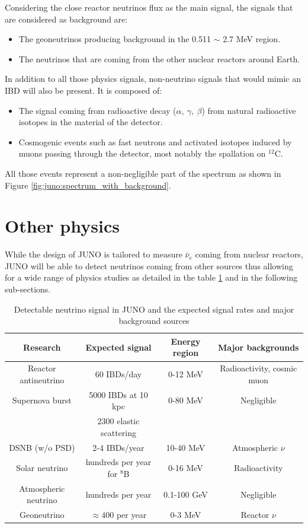 \documentclass[../main.tex]{subfiles}
\begin{document}
Considering the close reactor neutrinos flux as the main signal, the signals that are considered as background are:
\begin{itemize}
  \item The geoneutrinos producing background in the 0.511 $\sim$ 2.7 MeV region.
  \item The neutrinos that are coming from the other nuclear reactors around Earth.
\end{itemize}
In addition to all those physics signals, non-neutrino signals that would mimic an IBD will also be present. It is composed of:
\begin{itemize}
  \item The signal coming from radioactive decay ($\alpha, ~ \gamma, ~ \beta$) from natural radioactive isotopes in the material of the detector.
  \item Cosmogenic events such as fast neutrons and activated isotopes induced by muons passing through the detector, most notably the spallation on $^{12}$C.
\end{itemize}
All those events represent a non-negligible part of the spectrum as shown in Figure \ref{fig:juno:spectrum_with_background}.


\section{Other physics}

While the design of JUNO is tailored to measure $\bar{\nu}_e$ coming from nuclear reactors, JUNO will be able to detect neutrinos coming from other sources thus allowing for a wide range of physics studies as detailed in the table \ref{tab:juno:signal} and in the following sub-sections.

\begin{table}[ht]
\begin{center}
  \begin{tabular}{|c|c|c|c|}
    \hline Research & Expected signal & Energy region & Major backgrounds \\
    \hline Reactor antineutrino & 60 IBDs/day & 0-12 MeV  & Radioactivity, cosmic muon \\
    Supernova burst & 5000 IBDs at 10 kpc & 0-80 MeV & Negligible \\
                    & 2300 elastic scattering  & &  \\
    DSNB (w/o PSD) & 2-4 IBDs/year & 10-40 MeV & Atmospheric $\nu$ \\
    Solar neutrino & hundreds per year for $^8$B & 0-16 MeV & Radioactivity \\
    Atmospheric neutrino & hundreds per year & 0.1-100 GeV  & Negligible \\
    Geoneutrino &  $\approx 400$ per year & 0-3 MeV & Reactor $\nu$ \\
    \hline
  \end{tabular}
  \caption{Detectable neutrino signal in JUNO and the expected signal rates and major background sources}
  \label{tab:juno:signal}
\end{center}
\end{table}
\end{document}

